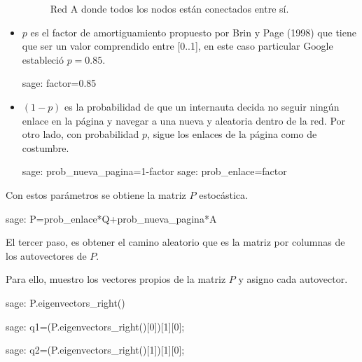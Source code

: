 \begin{itemize}
    \begin{figure}[H]
        \centering
        \label{redA_2}
        \caption{Red A donde todos los nodos están conectados entre sí.}
    \end{figure}
    \item $p$ es el factor de amortiguamiento propuesto por Brin y Page (1998) que tiene que ser un valor 
    comprendido entre [0..1], en este caso particular Google estableció $p=0.85$.
    \begin{sagecommandline}
        sage: factor=0.85
    \end{sagecommandline}
    \item  $(1-p)$ es la probabilidad de que un internauta decida no seguir ningún enlace en la página y 
    navegar a una nueva y aleatoria dentro de la red. Por otro lado, con probabilidad $p$, sigue los enlaces de 
    la página como de costumbre.
    \begin{sagecommandline}
        sage: prob_nueva_pagina=1-factor
        sage: prob_enlace=factor
    \end{sagecommandline}
\end{itemize}

\par Con estos parámetros se obtiene la matriz $P$ estocástica.
\begin{sagecommandline}
    sage: P=prob_enlace*Q+prob_nueva_pagina*A
\end{sagecommandline}

\par El tercer paso, es obtener el camino aleatorio que es la matriz por columnas de los autovectores de $P$.

\par Para ello, muestro los vectores propios de la matriz $P$ y asigno cada autovector.
\begin{sagecommandline}[\textwidth]
    sage: P.eigenvectors_right()
\end{sagecommandline}
    
\begin{sagecommandline}
    sage: q1=(P.eigenvectors_right()[0])[1][0];
\end{sagecommandline}

\begin{sagecommandline}
    sage: q2=(P.eigenvectors_right()[1])[1][0];
\end{sagecommandline}

